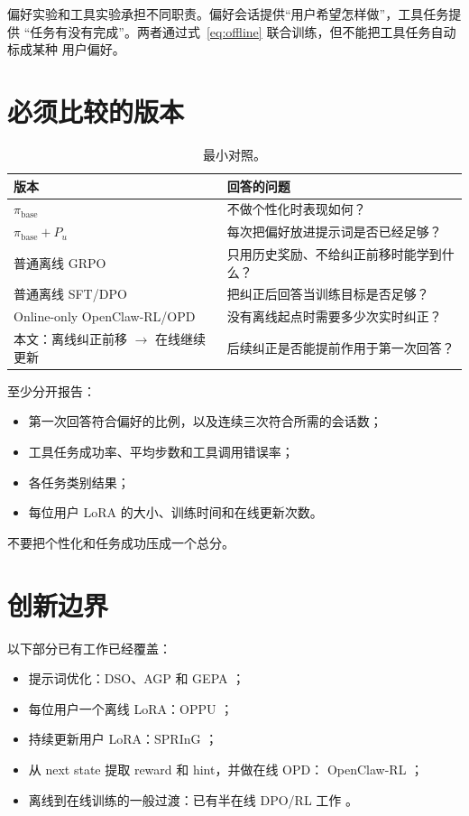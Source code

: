 \documentclass[11pt,UTF8,fontset=fandol]{ctexart}
\newcommand{\basepolicy}{\pi_{\mathrm{base}}}
\begin{document}
偏好实验和工具实验承担不同职责。偏好会话提供``用户希望怎样做''，工具任务提供
``任务有没有完成''。两者通过式~\eqref{eq:offline} 联合训练，但不能把工具任务自动标成某种
用户偏好。

\section{必须比较的版本}

\begin{table}[H]
  \centering
  \caption{最小对照。}
  \begin{tabularx}{\textwidth}{@{}L{0.31\textwidth}Y@{}}
    \toprule
    版本 & 回答的问题 \\
    \midrule
    \(\basepolicy\) &
    不做个性化时表现如何？ \\
    \(\basepolicy+P_u\) &
    每次把偏好放进提示词是否已经足够？ \\
    普通离线 GRPO &
    只用历史奖励、不给纠正前移时能学到什么？ \\
    普通离线 SFT/DPO &
    把纠正后回答当训练目标是否足够？ \\
    Online-only OpenClaw-RL/OPD &
    没有离线起点时需要多少次实时纠正？ \\
    本文：离线纠正前移 \(\rightarrow\) 在线继续更新 &
    后续纠正是否能提前作用于第一次回答？ \\
    \bottomrule
  \end{tabularx}
\end{table}

至少分开报告：
\begin{itemize}
  \item 第一次回答符合偏好的比例，以及连续三次符合所需的会话数；
  \item 工具任务成功率、平均步数和工具调用错误率；
  \item 各任务类别结果；
  \item 每位用户 LoRA 的大小、训练时间和在线更新次数。
\end{itemize}
不要把个性化和任务成功压成一个总分。

\section{创新边界}

以下部分已有工作已经覆盖：
\begin{itemize}
  \item 提示词优化：DSO、AGP 和 GEPA
    \cite{kiyohara2025prompt,wang2025agp,agrawal2025gepa}；
  \item 每位用户一个离线 LoRA：OPPU \cite{tan2024oppu}；
  \item 持续更新用户 LoRA：SPRInG \cite{kim2026spring}；
  \item 从 next state 提取 reward 和 hint，并做在线 OPD：
    OpenClaw-RL \cite{wang2026openclaw}；
  \item 离线到在线训练的一般过渡：已有半在线 DPO/RL 工作
    \cite{lanchantin2025bridging}。
\end{itemize}
\end{document}
